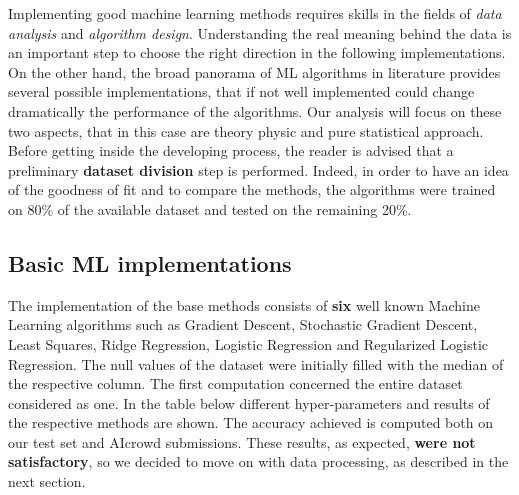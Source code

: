 \documentclass[10pt,article]{IEEEtran}
\begin{document}
Implementing good machine learning methods requires skills in the fields of \textit{data analysis} and \textit{algorithm design}. Understanding the real meaning behind the data is an important step to choose the right direction in the following implementations. On the other hand, the broad panorama of ML algorithms in literature provides several possible implementations, that if not well implemented could change dramatically the performance of the algorithms. Our analysis will focus on these two aspects, that in this case are theory physic and pure statistical approach.
Before getting inside the developing process, the reader is advised that a preliminary \textbf{dataset division} step is performed. Indeed, in order to have an idea of the goodness of fit and to compare the methods, the algorithms were trained on 80\% of the available dataset and tested on the remaining 20\%.

\subsection{Basic ML implementations}
\label{subsec:model-impl}
The implementation of the base methods consists of \textbf{six} well known Machine Learning algorithms such as Gradient Descent, Stochastic Gradient Descent, Least Squares, Ridge Regression, Logistic Regression and Regularized Logistic Regression. The null values of the dataset were initially filled with the median of the respective column. The first computation concerned the entire dataset considered as one. In the table below different hyper-parameters and results of the respective methods are shown. The accuracy achieved is computed both on our test set and AIcrowd submissions. These results, as expected, \textbf{were not satisfactory}, so we decided to move on with data processing, as described in the next section.
\end{document}
